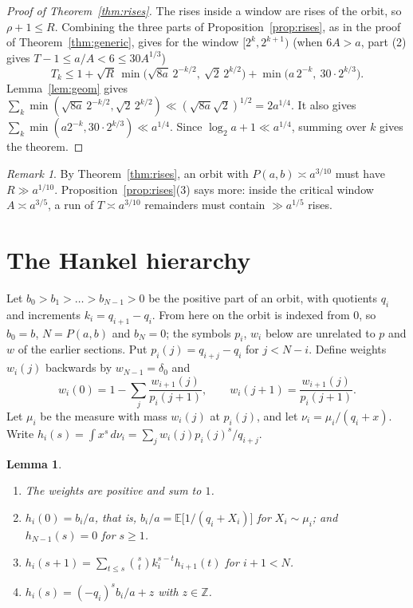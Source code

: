 \documentclass[11pt]{amsart}
\newtheorem{lemma}[theorem]{Lemma}
\theoremstyle{definition}
\theoremstyle{remark}
\newtheorem{remark}[theorem]{Remark}
\begin{document}
\begin{proof}[Proof of Theorem~\ref{thm:rises}]
The rises inside a window are rises of the orbit, so $\rho+1\le R$. Combining the three parts
of Proposition~\ref{prop:rises}, as in the proof of Theorem~\ref{thm:generic}, gives for the
window $[2^k,2^{k+1})$ (when $6A>a$, part (2) gives $T-1\le a/A<6\le30A^{1/3}$)
\[
T_k\le 1+\sqrt R\,\min\bigl(\sqrt{8a}\,2^{-k/2},\ \sqrt2\,2^{k/2}\bigr)
+\min\bigl(a\,2^{-k},\ 30\cdot2^{k/3}\bigr).
\]
Lemma~\ref{lem:geom} gives
$\sum_k\min(\sqrt{8a}\,2^{-k/2},\sqrt2\,2^{k/2})\ll(\sqrt{8a}\sqrt2)^{1/2}=2a^{1/4}$. It also gives
$\sum_k\min(a2^{-k},30\cdot2^{k/3})\ll a^{1/4}$. Since $\log_2a+1\ll a^{1/4}$, summing over $k$
gives the theorem.
\end{proof}

\begin{remark}
By Theorem~\ref{thm:rises}, an orbit with $P(a,b)\asymp a^{3/10}$ must have $R\gg a^{1/10}$.
Proposition~\ref{prop:rises}(3) says more: inside the critical window $A\asymp a^{3/5}$, a
run of $T\asymp a^{3/10}$ remainders must contain $\gg a^{1/5}$ rises.
\end{remark}

\section{The Hankel hierarchy}\label{sec:hankel}

Let $b_0>b_1>\dots>b_{N-1}>0$ be the positive part of an orbit, with quotients $q_i$ and
increments $k_i=q_{i+1}-q_i$. From
here on the orbit is indexed from $0$, so $b_0=b$, $N=P(a,b)$ and $b_N=0$; the symbols $p_i$,
$w_i$ below are unrelated to $p$ and $w$ of the earlier sections. Put $p_i(j)=q_{i+j}-q_i$ for $j<N-i$. Define weights
$w_i(j)$ backwards by $w_{N-1}=\delta_0$ and
\[
w_i(0)=1-\sum_{j}\frac{w_{i+1}(j)}{p_i(j+1)},\qquad w_i(j+1)=\frac{w_{i+1}(j)}{p_i(j+1)} .
\]
Let $\mu_i$ be the measure with mass $w_i(j)$ at $p_i(j)$, and let
$\nu_i=\mu_i/(q_i+x)$. Write $h_i(s)=\int x^s\,d\nu_i=\sum_jw_i(j)p_i(j)^s/q_{i+j}$.

\begin{lemma}\label{lem:moments}
\begin{enumerate}
\item The weights are positive and sum to $1$.
\item $h_i(0)=b_i/a$, that is, $b_i/a=\mathbb E\bigl[1/(q_i+X_i)\bigr]$ for $X_i\sim\mu_i$; and
$h_{N-1}(s)=0$ for $s\ge1$.
\item $h_i(s+1)=\sum_{t\le s}\binom st k_i^{s-t}h_{i+1}(t)$ for $i+1<N$.
\item $h_i(s)=(-q_i)^sb_i/a+z$ with $z\in\mathbb Z$.
\end{enumerate}
\end{lemma}
\end{document}
